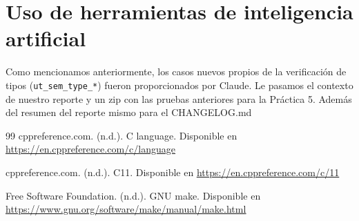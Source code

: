 \documentclass[12pt,letterpaper]{article}
\begin{document}
\section*{Uso de herramientas de inteligencia artificial}

Como mencionamos anteriormente, los casos nuevos propios de la verificación de tipos
(\texttt{ut\_sem\_type\_*}) fueron proporcionados por Claude. Le pasamos el contexto de nuestro reporte y un zip con las pruebas anteriores para la Práctica 5. Además del resumen del reporte mismo para el CHANGELOG.md

\begin{thebibliography}{99}
  cppreference.com. (n.d.). C language. Disponible en
  \textcolor{links}{\uline{\url{https://en.cppreference.com/c/language}}}

  cppreference.com. (n.d.). C11. Disponible en
  \textcolor{links}{\uline{\url{https://en.cppreference.com/c/11}}}

  Free Software Foundation. (n.d.). GNU make. Disponible en
  \textcolor{links}{\uline{\url{https://www.gnu.org/software/make/manual/make.html}}}
\end{thebibliography}
\end{document}
